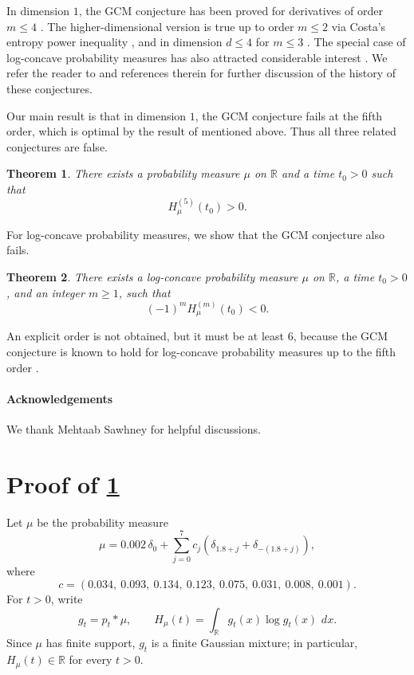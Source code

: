 \documentclass[11pt]{article}
\newtheorem{theorem}{Theorem}
\newcommand{\R}{\mathbb R}
\newcommand{\dd}{\,d}
\def\isarxiv{1}
\begin{document}
In dimension \(1\), the GCM conjecture has been proved for derivatives of order \(m\le 4\) \cite{cheng2015higher}.
The higher-dimensional version is true up to order \(m\le 2\) via Costa's entropy power inequality \cite{costa1985new,villani2000short}, and in dimension \(d\le 4\) for \(m\le 3\) \cite{guo2022lower}.
The special case of log-concave probability measures has also attracted considerable interest \cite{toscani2015concavity,zhang2018gaussian,guo2022lower,wang2025higher}.
We refer the reader to \cite{ledoux2024differentials,wang2025higher} and references therein for further discussion of the history of these conjectures.

Our main result is that in dimension \(1\), the GCM conjecture fails at the fifth order, which is optimal by the result of \cite{cheng2015higher} mentioned above. Thus all three related conjectures are false.

\begin{theorem}\label{thm:gcmc}
There exists a probability measure \(\mu\) on \(\R\) and a time \(t_0>0\) such that
\[
   H_\mu^{(5)}(t_0)>0.
\]
\end{theorem}

For log-concave probability measures, we show that the GCM conjecture also fails.
\begin{theorem}\label{thm:gcmc-log-conc}
There exists a log-concave probability measure \(\mu\) on \(\R\), a time \(t_0>0\), and an integer \(m\ge 1\), such that
\[
   (-1)^m H_\mu^{(m)}(t_0)<0.
\]
\end{theorem}
An explicit order is not obtained, but it must be at least \(6\), because the GCM conjecture is known to hold for log-concave probability measures up to the fifth order \cite{zhang2018gaussian,wang2025higher}.

\ifdefined\isarxiv
\paragraph{Acknowledgements} We thank Mehtaab Sawhney for helpful discussions.
\fi

\section{Proof of \texorpdfstring{\cref{thm:gcmc}}{Theorem 1}} \label{sec:proof-thm-gcmc}

Let \(\mu\) be the probability measure
\begin{equation}\label{eq:atomic-counterexample}
   \mu
   =
   0.002\,\delta_0
   +
   \sum_{j=0}^{7}
   c_j
   \left(\delta_{1.8+j}+\delta_{-(1.8+j)}\right),
\end{equation}
where
\begin{equation}\label{eq:c-vector}
   c=(0.034,\ 0.093,\ 0.134,\ 0.123,\ 0.075,\ 0.031,\ 0.008,\ 0.001).
\end{equation}
For \(t>0\), write
\[
   g_t=p_t*\mu,
   \qquad
   H_\mu(t)=\int_\R g_t(x)\log g_t(x)\,\dd x .
\]
Since \(\mu\) has finite support, \(g_t\) is a finite Gaussian mixture; in particular, \(H_\mu(t)\in\R\) for every \(t>0\).
\end{document}

